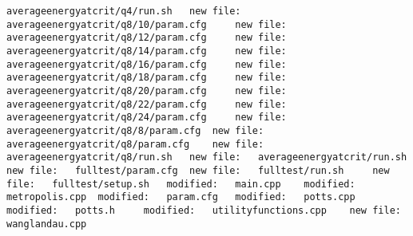 \documentclass[12pt,a4paper,notitlepage,twoside]{memoir}
\begin{document}
\begin{lstlisting}[breaklines]
averageenergyatcrit/q4/run.sh 	new file:   averageenergyatcrit/q8/10/param.cfg 	new file:   averageenergyatcrit/q8/12/param.cfg 	new file:   averageenergyatcrit/q8/14/param.cfg 	new file:   averageenergyatcrit/q8/16/param.cfg 	new file:   averageenergyatcrit/q8/18/param.cfg 	new file:   averageenergyatcrit/q8/20/param.cfg 	new file:   averageenergyatcrit/q8/22/param.cfg 	new file:   averageenergyatcrit/q8/24/param.cfg 	new file:   averageenergyatcrit/q8/8/param.cfg 	new file:   averageenergyatcrit/q8/param.cfg 	new file:   averageenergyatcrit/q8/run.sh 	new file:   averageenergyatcrit/run.sh 	new file:   fulltest/param.cfg 	new file:   fulltest/run.sh 	new file:   fulltest/setup.sh 	modified:   main.cpp 	modified:   metropolis.cpp 	modified:   param.cfg 	modified:   potts.cpp 	modified:   potts.h 	modified:   utilityfunctions.cpp 	new file:   wanglandau.cpp


\end{lstlisting}
\end{document}
